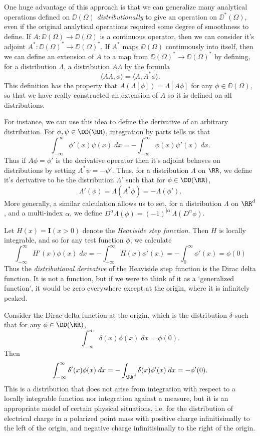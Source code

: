 One huge advantage of this approach is that we can generalize many analytical operations defined on $\DD(\Omega)$ \emph{distributionally} to give an operation on $\DD^*(\Omega)$, even if the original analytical operations required some degree of smoothness to define. If $A: \DD(\Omega) \to \DD(\Omega)$ is a continuous operator, then we can consider it's adjoint $A^*: \DD(\Omega)^* \to \DD(\Omega)^*$. If $A^*$ maps $\DD(\Omega)$ continuously into itself, then we can define an extension of $A$ to a map from $\DD(\Omega)^* \to \DD(\Omega)^*$ by defining, for a distribution $\Lambda$, a distribution $A \Lambda$ by the formula
%
\[ \langle A \Lambda, \phi \rangle = \langle \Lambda, A^* \phi \rangle. \]
%
This definition has the property that $A(\Lambda[\phi]) = \Lambda[A \phi ]$ for any $\phi \in \DD(\Omega)$, so that we have really constructed an extension of $A$ so it is defined on all distributions.

For instance, we can use this idea to define the derivative of an arbitrary distribution. For $\phi,\psi \in \DD(\RR)$, integration by parts tells us that
%
\[ \int_{-\infty}^\infty \phi'(x) \psi(x)\; dx = - \int_{-\infty}^\infty \phi(x) \psi'(x)\; dx. \]
%
Thus if $A\phi = \phi'$ is the derivative operator then it's adjoint behaves on distributions by setting $A^* \psi = - \psi'$. Thus, for a distribution $\Lambda$ on $\RR$, we define it's derivative to be the distribution $\Lambda'$ such that for $\phi \in \DD(\RR)$,
%
\[ \Lambda'(\phi) = \Lambda(A^* \phi) = - \Lambda(\phi'). \]
%
More generally, a similar calculation allows us to set, for a distribution $\Lambda$ on $\RR^d$, and a multi-index $\alpha$, we define $D^\alpha \Lambda(\phi) = (-1)^{|\alpha|} \Lambda(D^\alpha \phi)$.

\begin{example}
    Let $H(x) = \mathbf{I}(x > 0)$ denote the {\it Heaviside step function}. Then $H$ is locally integrable, and so for any test function $\phi$, we calculate
    \[ \int_{-\infty}^\infty H'(x) \phi(x)\; dx = - \int_{-\infty}^\infty H(x) \phi'(x) = - \int_0^\infty \phi'(x) = \phi(0) \]
    Thus the \emph{distributional derivative} of the Heaviside step function is the Dirac delta function. It is not a function, but if we were to think of it as a `generalized function', it would be zero everywhere except at the origin, where it is infinitely peaked.
\end{example}

\begin{example}
    Consider the Dirac delta function at the origin, which is the distribution $\delta$ such that for any $\phi \in \DD(\RR)$,
    \[ \int_{-\infty}^\infty \delta(x) \phi(x)\; dx = \phi(0). \]
    Then
    \[ \int_{-\infty}^\infty \delta'(x) \phi(x)\; dx = - \int_{\RR^d} \delta(x) \phi'(x)\; dx = - \phi'(0). \]
    This is a distribution that does not arise from integration with respect to a locally integrable function nor integration against a measure, but it is an appropriate model of certain physical situations, i.e. for the distribution of electrical charge in a polarized point mass with positive charge infinitisimally to the left of the origin, and negative charge infinitisimally to the right of the origin.
\end{example}

